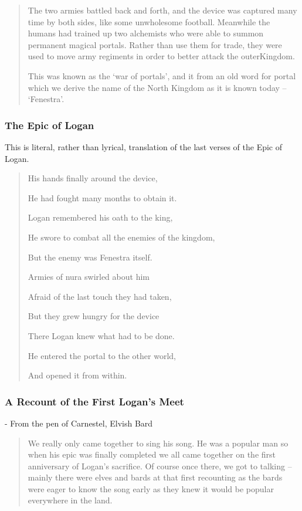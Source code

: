 \begin{multicols}{2}
\begin{quotation}
  The two armies battled back and forth, and the device was captured many time by both sides, like some unwholesome football.
  Meanwhile the humans had trained up two alchemists who were able to summon permanent magical portals.
  Rather than use them for trade, they were used to move army regiments in order to better attack the \gls{outerKingdom}.

  This was known as the `war of portals', and it from an old word for portal which we derive the name of the North Kingdom as it is known today -- `Fenestra'.

\end{quotation}

\subsubsection{The Epic of Logan}

This is literal, rather than lyrical, translation of the last verses of the Epic of Logan.

\begin{verse}

  His hands finally around the device,

  He had fought many months to obtain it.

  Logan remembered his oath to the king,

  He swore to combat all the enemies of the kingdom,

  But the enemy was Fenestra itself.

  Armies of nura swirled about him

  Afraid of the last touch they had taken,

  But they grew hungry for the device

  There Logan knew what had to be done.

  He entered the portal to the other world,

  And opened it from within.

\end{verse}

\subsubsection{A Recount of the First Logan's Meet}

- From the pen of Carnestel, Elvish Bard

\begin{quotation}

  We really only came together to sing his song.
  He was a popular man so when his epic was finally completed we all came together on the first anniversary of Logan's sacrifice.
  Of course once there, we got to talking -- mainly there were elves and bards at that first recounting as the bards were eager to know the song early as they knew it would be popular everywhere in the land.


\end{quotation}
\end{multicols}
